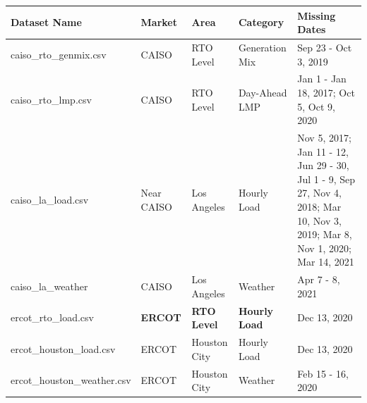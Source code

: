 \documentclass[11pt]{article}
\numberwithin{equation}{section}
\numberwithin{table}{section}
\numberwithin{figure}{section}
\begin{document}
\begin{table}[htbp]
	\scriptsize
	\begin{tabular}{llllp{}}
	\toprule
	\multicolumn{1}{l}{\textbf{Dataset Name}} & \multicolumn{1}{l}{\textbf{Market}} & \multicolumn{1}{l}{\textbf{Area}} & \multicolumn{1}{l}{\textbf{Category}} & \multicolumn{1}{l}{\textbf{Missing Dates}}                                                                                   \\
	\midrule
	caiso\_rto\_genmix.csv                    & CAISO                               & RTO Level                         & Generation Mix                        & Sep 23 - Oct 3, 2019                                                                                                         \\
	caiso\_rto\_lmp.csv                       & CAISO                               & RTO Level                         & Day-Ahead LMP                         & Jan 1 - Jan 18, 2017; Oct 5, Oct 9, 2020                                                                                     \\
	caiso\_la\_load.csv                       & Near CAISO                          & Los Angeles                       & Hourly Load                           & Nov 5, 2017; Jan 11 - 12, Jun 29 - 30, Jul 1 - 9, Sep 27, Nov 4, 2018; Mar 10, Nov 3, 2019; Mar 8, Nov 1, 2020; Mar 14, 2021 \\
	caiso\_la\_weather                        & CAISO                               & Los Angeles                       & Weather                               & Apr 7 - 8, 2021                                                                                                              \\
	ercot\_rto\_load.csv                      & \textbf{ERCOT}                      & \textbf{RTO Level}                & \textbf{Hourly Load}                  & Dec 13, 2020                                                                                                                 \\
	ercot\_houston\_load.csv                  & ERCOT                               & Houston City                      & Hourly Load                           & Dec 13, 2020                                                                                                                 \\
	ercot\_houston\_weather.csv               & ERCOT                               & Houston City                      & Weather                               & Feb 15 - 16, 2020                                                                                                            \\

\end{tabular}
\end{table}
\end{document}
